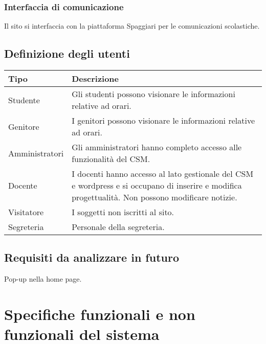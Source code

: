 \documentclass{article}
\begin{document}
	\subsubsection{\textbf{Interfaccia di comunicazione}}
	Il sito si interfaccia con la piattaforma Spaggiari per le comunicazioni scolastiche.	

	\subsection{\textbf{Definizione degli utenti}}
\begin{tabular}{ |p{3cm}|p{8cm}|  }
	\hline
	\textbf{Tipo}& \textbf{Descrizione}\\
	\hline
	Studente   & Gli studenti possono visionare le informazioni relative ad orari. \\
	\hline
	Genitore   & I genitori possono visionare le informazioni relative ad orari.
	\\
	\hline
	Amministratori  & Gli amministratori hanno completo accesso alle funzionalità del CSM.\\	
	\hline
	Docente & I docenti hanno accesso al lato gestionale del CSM e wordpress e si occupano di inserire e modifica progettualità. Non possono modificare notizie.\\
	\hline
	Visitatore & I soggetti non iscritti al sito.\\
	\hline
	Segreteria & Personale della segreteria.\\
\hline
\end{tabular}

	\subsection{\textbf{Requisiti da analizzare in futuro}}
	Pop-up nella home page.	
\clearpage
	\Large \section{\textbf{Specifiche funzionali e non funzionali del sistema}} 
\end{document}
